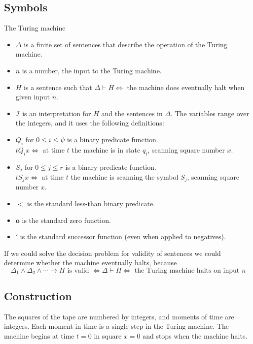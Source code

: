 \subsection{Symbols}
\newcommand{\z}{\mathbf{o}}

The Turing machine 

\begin{itemize}
\item $\Delta$ is a finite set of sentences that describe the operation of the Turing machine.
\item $n$ is a number, the input to the Turing machine.
\item $H$ is a sentence such that $\Delta\vdash H\iff$ the machine does eventually halt when given input $n$.
\item $\mathscr{I}$ is an interpretation for $H$ and the sentences in $\Delta$. The variables range over the integers, and it uses the following definitions:
\item $Q_i$ for $0 \le i \le \psi$ is a binary predicate function.\\
$t Q_i x \iff $ at time $t$ the machine is in state $q_i$, scanning square number $x$.
\item $S_j$ for $0\le j\le r$ is a binary predicate function.\\
$t S_j x \iff $ at time $t$ the machine is scanning the symbol $S_j$, scanning square number $x$.
\item $<$ is the standard less-than binary predicate.
\item $\z$ is the standard zero function.
\item $'$ is the standard successor function (even when applied to negatives).
\end{itemize}

If we could solve the decision problem for validity of sentences we could determine whether the machine eventually halts, because 
\[\Delta_1 \land  \Delta_2 \land  \cdots \rightarrow H\text{ is valid }\iff \Delta\vdash H \iff \text{ the Turing machine halts on input }n\]

\subsection{Construction}
The squares of the tape are numbered by integers, and moments of time are integers. Each moment in time is a single step in the Turing machine. The machine begins at time $t=0$ in square $x=0$ and stops when the machine halts. 

